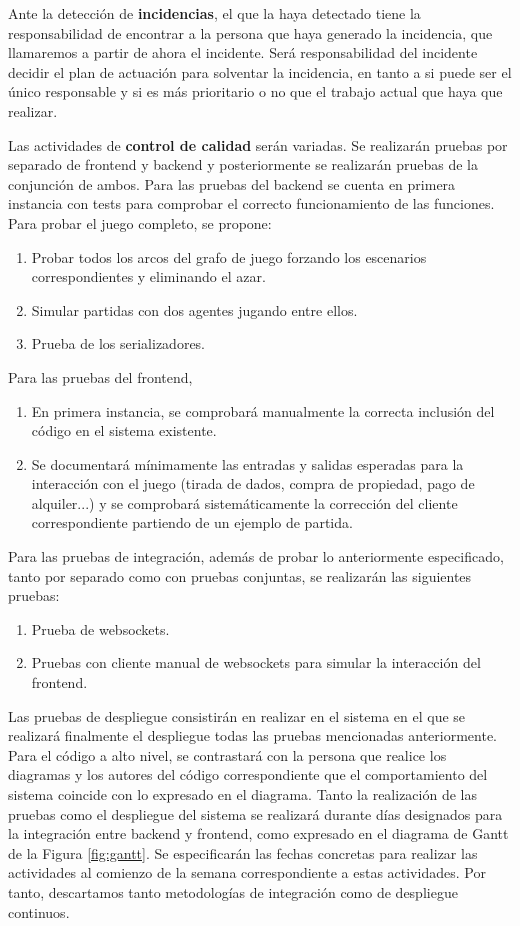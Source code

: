 \documentclass[11pt]{article}
\begin{document}
Ante la detección de \textbf{incidencias}, el que la haya detectado tiene la
responsabilidad de encontrar a la persona que haya generado la incidencia,
que llamaremos a partir de ahora el incidente. Será responsabilidad del
incidente decidir el plan de actuación para solventar la incidencia, en tanto
a si puede ser el único responsable y si es más prioritario o no que el
trabajo actual que haya que realizar.

Las actividades de \textbf{control de calidad} serán variadas. 
Se realizarán pruebas por separado de frontend y backend y posteriormente se
realizarán pruebas de la conjunción de ambos.
Para las pruebas del backend se cuenta en primera instancia con tests para
comprobar el correcto funcionamiento de las funciones. Para probar el juego
completo, se propone:
\begin{enumerate}
		\item Probar todos los arcos del grafo de juego forzando los escenarios correspondientes y eliminando el azar.
		\item Simular partidas con dos agentes jugando entre ellos.
		\item Prueba de los serializadores.
\end{enumerate}
Para las pruebas del frontend, 
\begin{enumerate}
		\item En primera instancia, se comprobará manualmente la correcta inclusión del código en el sistema existente. 
		\item Se documentará mínimamente las entradas y salidas esperadas
				para la interacción con el juego (tirada de dados,
				compra de propiedad, pago de alquiler...) y se comprobará
				sistemáticamente la corrección del cliente correspondiente
				partiendo de un ejemplo de partida.
\end{enumerate}
Para las pruebas de integración, además de probar lo anteriormente especificado,
tanto por separado como con pruebas conjuntas, se realizarán las siguientes pruebas:
\begin{enumerate}
		\item Prueba de websockets.
		\item Pruebas con cliente manual de websockets para simular la interacción del frontend.
\end{enumerate}
Las pruebas de despliegue consistirán en realizar en el sistema en el que se 
realizará finalmente el despliegue todas las pruebas mencionadas anteriormente.
Para el código a alto nivel, se contrastará con la persona que realice los
diagramas y los autores del código correspondiente que el comportamiento
del sistema coincide con lo expresado en el diagrama.
Tanto la realización de las pruebas como el despliegue del sistema se realizará
durante días designados para la integración entre backend y frontend, como
expresado en el diagrama de Gantt de la Figura \ref{fig:gantt}.
Se especificarán las fechas concretas para realizar las actividades al comienzo
de la semana correspondiente a estas actividades. Por tanto, descartamos tanto
metodologías de integración como de despliegue continuos.
\end{document}
